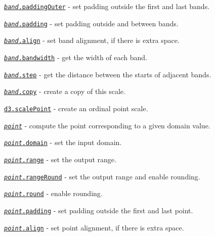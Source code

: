 \begin{DoxyItemize}
\item \href{https://github.com/d3/d3-scale/blob/master/README.md#band_paddingOuter}{\tt {\itshape band}.padding\+Outer} -\/ set padding outside the first and last bands.
\item \href{https://github.com/d3/d3-scale/blob/master/README.md#band_padding}{\tt {\itshape band}.padding} -\/ set padding outside and between bands.
\item \href{https://github.com/d3/d3-scale/blob/master/README.md#band_align}{\tt {\itshape band}.align} -\/ set band alignment, if there is extra space.
\item \href{https://github.com/d3/d3-scale/blob/master/README.md#band_bandwidth}{\tt {\itshape band}.bandwidth} -\/ get the width of each band.
\item \href{https://github.com/d3/d3-scale/blob/master/README.md#band_step}{\tt {\itshape band}.step} -\/ get the distance between the starts of adjacent bands.
\item \href{https://github.com/d3/d3-scale/blob/master/README.md#band_copy}{\tt {\itshape band}.copy} -\/ create a copy of this scale.
\item \href{https://github.com/d3/d3-scale/blob/master/README.md#scalePoint}{\tt d3.\+scale\+Point} -\/ create an ordinal point scale.
\item \href{https://github.com/d3/d3-scale/blob/master/README.md#_point}{\tt {\itshape point}} -\/ compute the point corresponding to a given domain value.
\item \href{https://github.com/d3/d3-scale/blob/master/README.md#point_domain}{\tt {\itshape point}.domain} -\/ set the input domain.
\item \href{https://github.com/d3/d3-scale/blob/master/README.md#point_range}{\tt {\itshape point}.range} -\/ set the output range.
\item \href{https://github.com/d3/d3-scale/blob/master/README.md#point_rangeRound}{\tt {\itshape point}.range\+Round} -\/ set the output range and enable rounding.
\item \href{https://github.com/d3/d3-scale/blob/master/README.md#point_round}{\tt {\itshape point}.round} -\/ enable rounding.
\item \href{https://github.com/d3/d3-scale/blob/master/README.md#point_padding}{\tt {\itshape point}.padding} -\/ set padding outside the first and last point.
\item \href{https://github.com/d3/d3-scale/blob/master/README.md#point_align}{\tt {\itshape point}.align} -\/ set point alignment, if there is extra space.

\end{DoxyItemize}
